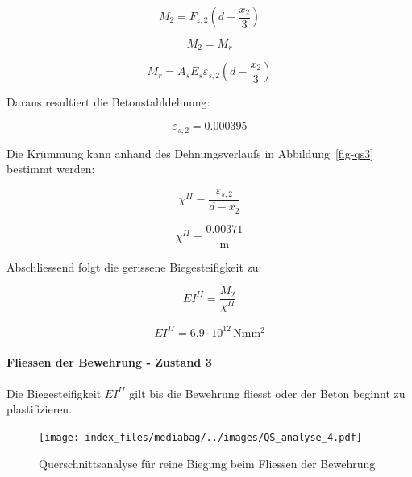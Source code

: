 \documentclass[
  12pt,
  letterpaper,
  egregdoesnotlikesansseriftitles]{scrreprt}
\let\oldparagraph\paragraph
\renewcommand{\paragraph}[1]{\oldparagraph{#1}\mbox{}}
\begin{document}
\begin{equation}M_{2} = F_{z,2} \left(d - \frac{x_{2}}{3}\right)\end{equation}

\begin{equation}M_{2} = M_{r}\end{equation}

\begin{equation}M_{r} = A_{s} E_{s} \varepsilon_{s,2} \left(d - \frac{x_{2}}{3}\right)\end{equation}

Daraus resultiert die Betonstahldehnung:

\begin{equation}\varepsilon_{s,2} = 0.000395\end{equation}

Die Krümmung kann anhand des Dehnungsverlaufs in Abbildung~\ref{fig-qs3}
bestimmt werden:

\begin{equation}\chi^{II} = \frac{\varepsilon_{s,2}}{d - x_{2}}\end{equation}

\begin{equation}\chi^{II} = \frac{0.00371}{\text{m}}\end{equation}

Abschliessend folgt die gerissene Biegesteifigkeit zu:

\begin{equation}EI^{II} = \frac{M_{2}}{\chi^{II}}\end{equation}

\begin{align}EI^{II} = 6.9 \cdot 10^{12} \, \mathrm{Nmm^2} \end{align}

\hypertarget{fliessen-der-bewehrung---zustand-3}{%
\paragraph{Fliessen der Bewehrung - Zustand
3}\label{fliessen-der-bewehrung---zustand-3}}

Die Biegesteifigkeit \(EI^{II}\) gilt bis die Bewehrung fliesst oder der
Beton beginnt zu plastifizieren.

\begin{figure}[H]

{\centering \texttt{[image: index\_files/mediabag/../images/QS\_analyse\_4.pdf]}

}

\caption{\label{fig-qs4}Querschnittsanalyse für reine Biegung beim
Fliessen der Bewehrung}

\end{figure}
\end{document}
